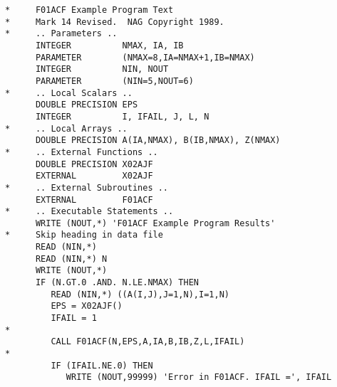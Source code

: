 \begin{small}
\begin{verbatim}
      *     F01ACF Example Program Text                                      
      *     Mark 14 Revised.  NAG Copyright 1989.                            
      *     .. Parameters ..                                                 
            INTEGER          NMAX, IA, IB                                    
            PARAMETER        (NMAX=8,IA=NMAX+1,IB=NMAX)                      
            INTEGER          NIN, NOUT                                       
            PARAMETER        (NIN=5,NOUT=6)                                  
      *     .. Local Scalars ..                                              
            DOUBLE PRECISION EPS                                             
            INTEGER          I, IFAIL, J, L, N                               
      *     .. Local Arrays ..                                               
            DOUBLE PRECISION A(IA,NMAX), B(IB,NMAX), Z(NMAX)                 
      *     .. External Functions ..                                         
            DOUBLE PRECISION X02AJF                                          
            EXTERNAL         X02AJF                                          
      *     .. External Subroutines ..                                       
            EXTERNAL         F01ACF                                          
      *     .. Executable Statements ..                                      
            WRITE (NOUT,*) 'F01ACF Example Program Results'                  
      *     Skip heading in data file                                        
            READ (NIN,*)                                                     
            READ (NIN,*) N                                                   
            WRITE (NOUT,*)                                                   
            IF (N.GT.0 .AND. N.LE.NMAX) THEN                                 
               READ (NIN,*) ((A(I,J),J=1,N),I=1,N)                           
               EPS = X02AJF()                                                
               IFAIL = 1                                                     
      *                                                                      
               CALL F01ACF(N,EPS,A,IA,B,IB,Z,L,IFAIL)                        
      *                                                                      
               IF (IFAIL.NE.0) THEN                                          
                  WRITE (NOUT,99999) 'Error in F01ACF. IFAIL =', IFAIL       

\end{verbatim}
\end{small}
